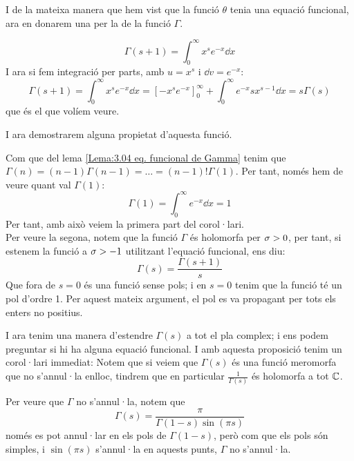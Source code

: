 I de la mateixa manera que hem vist que la funció $\theta$ tenia una equació funcional, ara en donarem una per la de la funció $\Gamma$.
\begin{pf}
    \[
        \Gamma(s+1)=\int_{0}^{\infty}x^se^{-x}\dd x
    \]
    I ara si fem integració per parts, amb $u=x^s$ i $\dd v=e^{-x}$:
    \[
        \Gamma(s+1)=\int_{0}^{\infty}x^se^{-x}\dd x=\left[-x^se^{-x}\right]_0^\infty+\int_0^\infty e^{-x}sx^{s-1}\dd x=s\Gamma(s)
    \]
    que és el que volíem veure.
\end{pf}
I ara demostrarem alguna propietat d'aquesta funció.
\begin{pf}
    Com que del lema \ref{Lema:3.04 eq. funcional de Gamma} tenim que $\Gamma(n)=(n-1)\Gamma(n-1)=\dots=(n-1)!\Gamma(1)$. Per tant, només hem de veure quant val $\Gamma(1)$:
    \[
        \Gamma(1)=\int_{0}^{\infty}e^{-x}\dd x=1
    \]
    Per tant, amb això veiem la primera part del corol·lari.\\
    Per veure la segona, notem que la funció $\Gamma$ és holomorfa per $\sigma>0$, per tant, si estenem la funció a $\sigma>-1$ utilitzant l'equació funcional, ens diu:
    \[
        \Gamma(s)=\frac{\Gamma(s+1)}{s}
    \]
    Que fora de $s=0$ és una funció sense pols; i en $s=0$ tenim que la funció té un pol d'ordre 1. Per aquest mateix argument, el pol es va propagant per tots els enters no positius.
\end{pf}
I ara tenim una manera d'estendre $\Gamma(s)$ a tot el pla complex; i ens podem preguntar si hi ha alguna equació funcional.
I amb aquesta proposició tenim un corol·lari immediat:
Notem que si veiem que $\Gamma(s)$ és una funció meromorfa que no s'annul·la enlloc, tindrem que en particular $\frac{1}{\Gamma(s)}$ és holomorfa a tot $\mathbb C$.
\begin{pf}
    Per veure que $\Gamma$ no s'annul·la, notem que 
    \[
        \Gamma(s)=\frac{\pi}{\Gamma(1-s)\sin(\pi s)}
    \]
    només es pot annul·lar en els pols de $\Gamma(1-s)$, però com que els pols són simples, i $\sin(\pi s)$ s'annul·la en aquests punts, $\Gamma$ no s'annul·la.
\end{pf}
